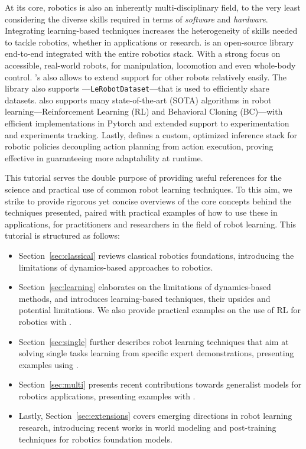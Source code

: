 At its core, robotics is also an inherently multi-disciplinary field, to the very least considering the diverse skills required in terms of \emph{software} and \emph{hardware}.
Integrating learning-based techniques increases the heterogeneity of skills needed to tackle robotics, whether in applications or research.
\lerobot is an open-source library end-to-end integrated with the entire robotics stack.
With a strong focus on accessible, real-world robots,  for manipulation, locomotion and even whole-body control. 
\lerobot's  also allows to extend support for other robots relatively easily. 
The library also supports ---\texttt{LeRobotDataset}---that is used to efficiently share datasets. 
\lerobot also supports many state-of-the-art (SOTA) algorithms in robot learning---Reinforcement Learning (RL) and Behavioral Cloning (BC)---with efficient implementations in Pytorch and extended support to experimentation and experiments tracking.
Lastly, \lerobot defines a custom, optimized inference stack for robotic policies decoupling action planning from action execution, proving effective in guaranteeing more adaptability at runtime.

This tutorial serves the double purpose of providing useful references for the science and practical use of common robot learning techniques.
To this aim, we strike to provide rigorous yet concise overviews of the core concepts behind the techniques presented, paired with practical examples of how to use these in applications, for practitioners and researchers in the field of robot learning.
This tutorial is structured as follows:
\begin{itemize}
\item Section~\ref{sec:classical} reviews classical robotics foundations, introducing the limitations of dynamics-based approaches to robotics.
\item Section~\ref{sec:learning} elaborates on the limitations of dynamics-based methods, and introduces learning-based techniques, their upsides and potential limitations. We also provide practical examples on the use of RL for robotics with \lerobot.
\item Section~\ref{sec:single} further describes robot learning techniques that aim at solving single tasks learning from specific expert demonstrations, presenting examples using \lerobot.
\item Section~\ref{sec:multi} presents recent contributions towards generalist models for robotics applications, presenting examples with \lerobot. 
\item Lastly, Section~\ref{sec:extensions} covers emerging directions in robot learning research, introducing recent works in world modeling and post-training techniques for robotics foundation models.
\end{itemize}

